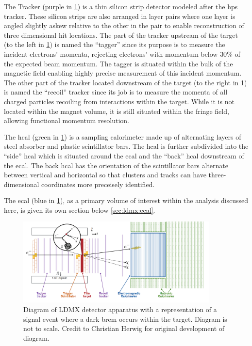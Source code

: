 The Tracker (purple in \cref{fig:ldmx-det}) is a thin silicon strip detector modeled after the
\ac{hps} tracker. These silicon strips are also arranged in layer pairs where one layer is angled
slightly askew relative to the other in the pair to enable reconstruction of three dimensional hit
locations. The part of the tracker upstream of the target (to the left in \cref{fig:ldmx-det}) is
named the ``tagger'' since its purpose is to measure the incident electrons' momenta, rejecting
electrons' with momentum below $30\%$ of the expected beam momentum. The tagger is situated within
the bulk of the magnetic field enabling highly precise measurement of this incident momentum. The
other part of the tracker located downstream of the target (to the right in \cref{fig:ldmx-det}) is
named the ``recoil'' tracker since its job is to measure the momenta of all charged particles
recoiling from interactions within the target. While it is not located within the magnet volume, it
is still situated within the fringe field, allowing functional momentum resolution.

The \ac{hcal} (green in \cref{fig:ldmx-det}) is a sampling calorimeter made up of alternating
layers of steel absorber and plastic scintillator bars. The \ac{hcal} is further subdivided into
the ``side'' \ac{hcal} which is situated around the \ac{ecal} and the ``back'' \ac{hcal}
downstream of the \ac{ecal}. The back \ac{hcal} has the orientation of the scintillator bars
alternate between vertical and horizontal so that clusters and tracks can have three-dimensional
coordinates more preceisely identified.

The \ac{ecal} (blue in \cref{fig:ldmx-det}), as a primary volume of interest within the analysis
discussed here, is given its own section below \cref{sec:ldmx:ecal}.

\begin{figure}
  \centering
  \includegraphics[width=0.9\textwidth]{figures/ldmx/experiment/detector.png}
  \caption{
    Diagram of LDMX detector apparatus with a representation of a signal event where
    a dark brem occurs within the target. Diagram is not to scale. Credit to Christian Herwig
    for original development of diagram.
  }
  \label{fig:ldmx-det}
\end{figure}

